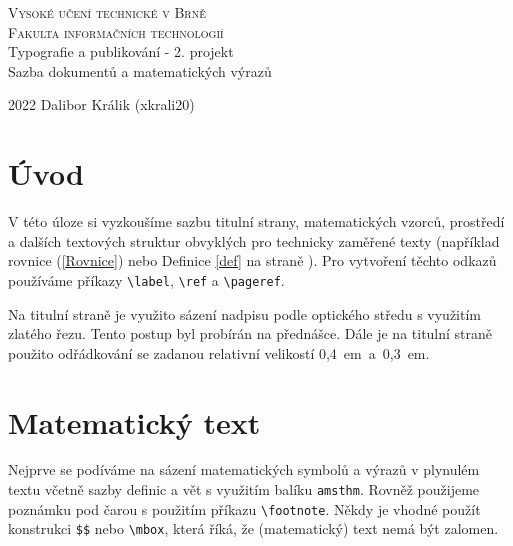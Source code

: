 \documentclass[a4paper, 11pt, twocolumn]{article}
\theoremstyle{definition}
\theoremstyle{definition}
\begin{document}
\thispagestyle{empty}

\begin{titlepage}
\begin{center}
    
    \Huge
    \textsc{
    Vysoké učení technické v Brně\\[0.4em]}
    \huge
    \textsc{
    Fakulta informačních technologií}\\
    {\LARGE
    Typografie a publikování - 2. projekt\\[0.3em]
    Sazba dokumentů a matematických výrazů\\
    }
\end{center}

{\Large 2022 \hfill
Dalibor Králik (xkrali20)}

\end{titlepage}
\newpage


\section*{Úvod}

V této úloze si vyzkoušíme sazbu titulní strany, matematických vzorců, prostředí a dalších textových struktur obvyklých pro technicky zaměřené texty (například rovnice (\ref{Rovnice}) nebo Definice \ref{def} na straně \pageref{def}). Pro vytvoření těchto odkazů používáme příkazy \texttt{{\textbackslash label}}, \texttt{{\textbackslash ref}} a \texttt{{\textbackslash pageref}}.\par

Na titulní straně je využito sázení nadpisu podle optického středu s využitím zlatého řezu. Tento postup byl probírán na přednášce. Dále je na titulní straně použito odřádkování se zadanou relativní velikostí 0,4~em~a~0,3~em.



\section{Matematický text}

Nejprve se podíváme na sázení matematických symbolů a výrazů v plynulém textu včetně sazby definic a vět s využitím balíku \texttt{amsthm}. Rovněž použijeme poznámku pod čarou s použitím příkazu \texttt{{\textbackslash footnote}}. Někdy je vhodné použít konstrukci \texttt{\$\string{\string}\$} nebo \texttt{{\textbackslash mbox\string{\string}}}, která říká, že (matematický) text nemá být zalomen. 
\end{document}
